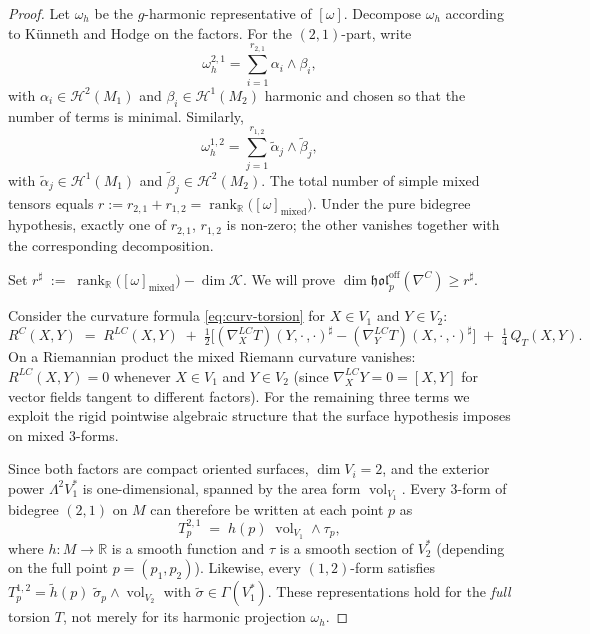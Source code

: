 \documentclass[11pt,reqno]{amsart}
\theoremstyle{plain}
\theoremstyle{definition}
\numberwithin{equation}{section}
\begin{document}
\begin{proof}
Let $\omega_h$ be the $g$-harmonic representative of $[\omega]$. Decompose $\omega_h$ according to K\"unneth and Hodge on the factors. For the $(2,1)$-part, write
\begin{equation}\label{eq:decomp21}
\omega_h^{2,1}=\sum_{i=1}^{r_{2,1}} \alpha_i\wedge \beta_i,
\end{equation}
with $\alpha_i\in \mathcal{H}^2(M_1)$ and $\beta_i\in \mathcal{H}^1(M_2)$ harmonic and chosen so that the number of terms is minimal. Similarly,
\begin{equation}\label{eq:decomp12}
\omega_h^{1,2}=\sum_{j=1}^{r_{1,2}} \tilde\alpha_j\wedge \tilde\beta_j,
\end{equation}
with $\tilde\alpha_j\in \mathcal{H}^1(M_1)$ and $\tilde\beta_j\in \mathcal{H}^2(M_2)$. The total number of simple mixed tensors equals $r:=r_{2,1}+r_{1,2}=\operatorname{rank}_\mathbb{R}\big([\omega]_{\mathrm{mixed}}\big)$. Under the pure bidegree hypothesis, exactly one of $r_{2,1}$, $r_{1,2}$ is non-zero; the other vanishes together with the corresponding decomposition.

Set $r^\sharp\;:=\;\operatorname{rank}_{\mathbb{R}}\bigl([\omega]_{\mathrm{mixed}}\bigr)-\dim\mathcal{K}$. We will prove $\dim\mathfrak{hol}_{p}^{\operatorname{off}}(\nabla^{C})\geq r^\sharp$.

Consider the curvature formula \eqref{eq:curv-torsion}
for $X\in V_1$ and $Y\in V_2$:
\[
  R^C(X,Y)
  \;=\;
  R^{LC}(X,Y)
  \;+\;
  \tfrac{1}{2}\bigl[
    (\nabla^{LC}_X T)(Y,\cdot\,,\cdot)^{\sharp}
    - (\nabla^{LC}_Y T)(X,\cdot\,,\cdot)^{\sharp}
  \bigr]
  \;+\;
  \tfrac{1}{4}\,Q_T(X,Y).
\]
On a Riemannian product the mixed Riemann curvature
vanishes: $R^{LC}(X,Y)=0$ whenever $X\in V_1$
and $Y\in V_2$
(since $\nabla^{LC}_XY=0=[X,Y]$ for vector fields
tangent to different factors).
For the remaining three terms we exploit the rigid
pointwise algebraic structure that the surface
hypothesis imposes on mixed $3$-forms.

Since both factors are compact oriented surfaces,
$\dim V_i=2$, and the exterior power
$\Lambda^2V_1^*$ is one-dimensional, spanned by the
area form $\operatorname{vol}_{V_1}$.
Every $3$-form of bidegree $(2,1)$ on $M$ can
therefore be written at each point $p$ as
\begin{equation}\label{eq:T21-ptwise}
  T^{2,1}_p
  \;=\;
  h(p)\;\operatorname{vol}_{V_1}\wedge\tau_p,
\end{equation}
where $h\colon M\to\mathbb{R}$ is a smooth function
and $\tau$ is a smooth section of $V_2^*$
(depending on the full point $p=(p_1,p_2)$).
Likewise, every $(1,2)$-form satisfies
$T^{1,2}_p
= \widetilde{h}(p)\;\widetilde{\sigma}_p
\wedge\operatorname{vol}_{V_2}$
with $\widetilde{\sigma}\in\Gamma(V_1^*)$.
These representations hold for the \emph{full}
torsion $T$, not merely for its harmonic
projection $\omega_h$.


\end{proof}
\end{document}
